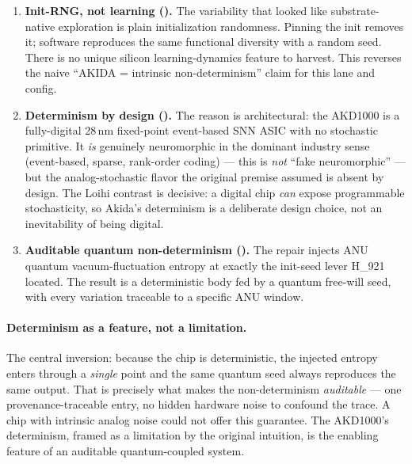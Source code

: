 \documentclass[11pt,a4paper]{article}
\providecommand{\tierGreen}{🟢}
\providecommand{\tierRed}{🔴}
\renewcommand{\tierGreen}{{\color{green!55!black}\textbullet}}
\renewcommand{\tierRed}{{\color{red!75!black}\textbullet}}
\begin{document}
\begin{enumerate}\itemsep0.35em
\item \textbf{Init-RNG, not learning (\tierRed).} The variability that
looked like substrate-native exploration is plain initialization
randomness. Pinning the init removes it; software reproduces the same
functional diversity with a random seed. There is no unique silicon
learning-dynamics feature to harvest. This reverses the naive ``AKIDA =
intrinsic non-determinism'' claim for this lane and config.
\item \textbf{Determinism by design (\tierGreen).} The reason is
architectural: the AKD1000 is a fully-digital 28\,nm fixed-point
event-based SNN ASIC with no stochastic primitive. It \emph{is} genuinely
neuromorphic in the dominant industry sense (event-based, sparse,
rank-order coding) --- this is \emph{not} ``fake neuromorphic'' --- but the
analog-stochastic flavor the original premise assumed is absent by design.
The Loihi contrast is decisive: a digital chip \emph{can} expose
programmable stochasticity, so Akida's determinism is a deliberate design
choice, not an inevitability of being digital.
\item \textbf{Auditable quantum non-determinism (\tierGreen).} The repair
injects ANU quantum vacuum-fluctuation entropy at exactly the init-seed
lever H\_921 located. The result is a deterministic body fed by a quantum
free-will seed, with every variation traceable to a specific ANU window.
\end{enumerate}

\paragraph{Determinism as a feature, not a limitation.} The central
inversion: because the chip is deterministic, the injected entropy enters
through a \emph{single} point and the same quantum seed always reproduces
the same output. That is precisely what makes the non-determinism
\emph{auditable} --- one provenance-traceable entry, no hidden hardware
noise to confound the trace. A chip with intrinsic analog noise could not
offer this guarantee. The AKD1000's determinism, framed as a limitation by
the original intuition, is the enabling feature of an auditable
quantum-coupled system.
\end{document}
